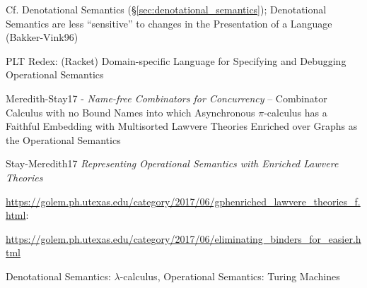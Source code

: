\fist Cf. Denotational Semantics (\S\ref{sec:denotational_semantics});
Denotational Semantics are less ``sensitive'' to changes in the
Presentation of a Language (Bakker-Vink96) %

PLT Redex: (Racket) Domain-specific Language for Specifying and
Debugging Operational Semantics

Meredith-Stay17 - \emph{Name-free Combinators for Concurrency} --
Combinator Calculus with no Bound Names into which Asynchronous
$\pi$-calculus has a Faithful Embedding with Multisorted Lawvere
Theories Enriched over Graphs as the Operational Semantics

Stay-Meredith17 \emph{Representing Operational Semantics with Enriched
Lawvere Theories}

\url{https://golem.ph.utexas.edu/category/2017/06/gphenriched_lawvere_theories_f.html}:

\url{https://golem.ph.utexas.edu/category/2017/06/eliminating_binders_for_easier.html}

Denotational Semantics: $\lambda$-calculus, Operational Semantics:
Turing Machines

